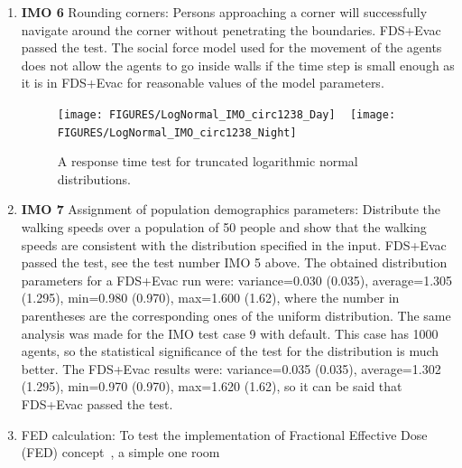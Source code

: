 \documentclass[12pt,a4paper,final,twoside]{stylevk}
\begin{document}
\begin{enumerate}
  constants $\tau_i$, and the initial positions.  This test is a
  little bit odd, because there is only 10 agents in the simulation so
  one can not get out any good statistics.  But one could see that
  each agent is starting accordingly to its randomly generated
  response time (both the response time and coordinates of the agent
  are printed out).  To test better the random distribution
  properties, the IMO test case 9 was used, where there are 1000
  agents.  Two different response time distributions were used, the
  day and night case ones of the IMO document~\cite{IMO07}.  These are
  both truncated logarithmic normal distributions.  The results of
  these tests are given in Fig.~\ref{Fig_IMOLogNormal}
%
\item \textbf{IMO 6} Rounding corners: Persons approaching a corner will
  successfully navigate around the corner without penetrating the
  boundaries.  FDS+Evac passed the test.  The social force model used
  for the movement of the agents does not allow the agents to go
  inside walls if the time step is small enough as it is in FDS+Evac
  for reasonable values of the model parameters.
%
\begin{figure}[!tb]
  \centerline{\texttt{[image: FIGURES/LogNormal\_IMO\_circ1238\_Day]} ~  
  \texttt{[image: FIGURES/LogNormal\_IMO\_circ1238\_Night]}}   
  \caption{A response time test for truncated logarithmic normal
  distributions.}\label{Fig_IMOLogNormal} 
\end{figure}
%
%
\item \textbf{IMO 7} Assignment of population demographics parameters:
  Distribute the walking speeds over a population of 50 people and
  show that the walking speeds are consistent with the distribution
  specified in the input.  FDS+Evac passed the test, see the test
  number IMO 5 above.  The obtained distribution parameters for a
  FDS+Evac run were: variance=0.030 (0.035), average=1.305 (1.295),
  min=0.980 (0.970), max=1.600 (1.62), where the number in parentheses
  are the corresponding ones of the uniform distribution.  The same
  analysis was made for the IMO test case 9 with default.  This case
  has 1000 agents, so the statistical significance of the test for the
  distribution is much better.  The FDS+Evac results were:
  variance=0.035 (0.035), average=1.302 (1.295), min=0.970 (0.970),
  max=1.620 (1.62), so it can be said that FDS+Evac passed the test.
%
\item FED calculation: To test the implementation of Fractional
  Effective Dose (FED) concept~\cite{Purser95}, a simple one room

\end{enumerate}
\end{document}
